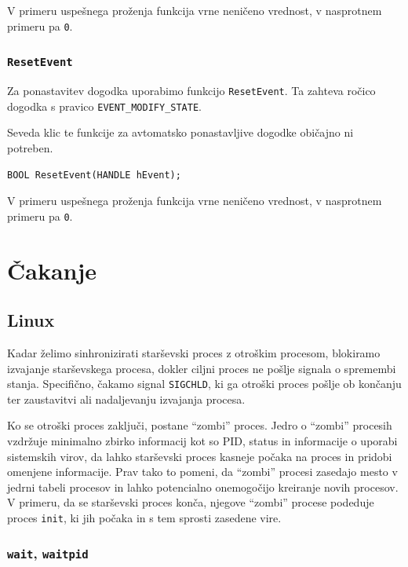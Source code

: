 \documentclass[a4paper,12pt,openright]{book}
\begin{document}
V primeru uspešnega proženja funkcija vrne neničeno vrednost, v nasprotnem primeru pa \texttt{0}.

\subsubsection{\texttt{ResetEvent}}

Za ponastavitev dogodka uporabimo funkcijo \texttt{ResetEvent}.
Ta zahteva ročico dogodka s pravico \texttt{EVENT\_MODIFY\_STATE}.

Seveda klic te funkcije za avtomatsko ponastavljive dogodke običajno ni potreben.

\begin{lstlisting}[style=func]
 BOOL ResetEvent(HANDLE hEvent);
\end{lstlisting}

V primeru uspešnega proženja funkcija vrne neničeno vrednost, v nasprotnem primeru pa \texttt{0}.

\section{Čakanje}

\subsection{Linux} \label{ssec:linux_syscalls:waiting}

Kadar želimo sinhronizirati starševski proces z otroškim procesom, blokiramo izvajanje starševskega procesa, dokler ciljni proces ne pošlje signala o spremembi stanja.
Specifično, čakamo signal \texttt{SIGCHLD}, ki ga otroški proces pošlje ob končanju ter zaustavitvi ali nadaljevanju izvajanja procesa.

Ko se otroški proces zaključi, postane ``zombi'' proces.
Jedro o ``zombi'' procesih vzdržuje minimalno zbirko informacij kot so PID, status in informacije o uporabi sistemskih virov, da lahko starševski proces kasneje počaka na proces in pridobi omenjene informacije.
Prav tako to pomeni, da ``zombi'' procesi zasedajo mesto v jedrni tabeli procesov in lahko potencialno onemogočijo kreiranje novih procesov.
V primeru, da se starševski proces konča, njegove ``zombi'' procese podeduje proces \texttt{init}, ki jih počaka in s tem sprosti zasedene vire.

\subsubsection{\texttt{wait}, \texttt{waitpid}}
\end{document}
